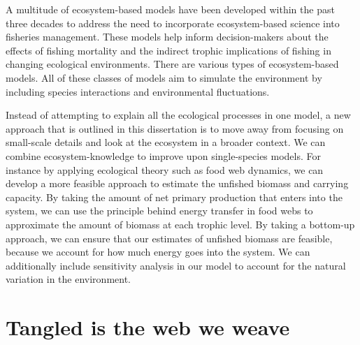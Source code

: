 \documentclass[oneside,12pt,final]{sty/ucthesis-CA2012}
\begin{document}
\begin{mainmatter}
\vspace{5mm}

A multitude of ecosystem-based models have been developed within the past three decades to address the need to incorporate ecosystem-based science into fisheries management. These models help inform decision-makers about the effects of fishing mortality and the indirect trophic implications of fishing in changing ecological environments. There are various types of ecosystem-based models. All of these classes of models aim to simulate the environment by including species interactions and environmental fluctuations. 

\vspace{5mm}

Instead of attempting to explain all the ecological processes in one model, a new approach that is outlined in this dissertation is to move away from focusing on small-scale details and look at the ecosystem in a broader context. We can combine ecosystem-knowledge to improve upon single-species models. For instance by applying ecological theory such as food web dynamics, we can develop a more feasible approach to estimate the unfished biomass and carrying capacity. By taking the amount of net primary production that enters into the system, we can use the principle behind energy transfer in food webs to approximate the amount of biomass at each trophic level. By taking a bottom-up approach, we can ensure that our estimates of unfished biomass are feasible, because we account for how much energy goes into the system. We can additionally include sensitivity analysis in our model to account for the natural variation in the environment.

%
%

\chapter{Tangled is the web we weave}


\end{mainmatter}
\end{document}
